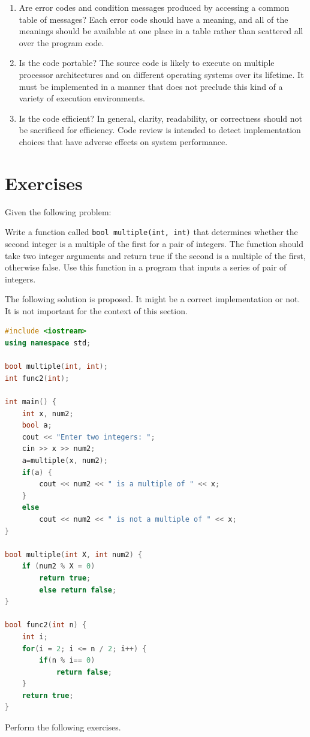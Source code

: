 \begin{enumerate}[nosep]
    \item Are error codes and condition messages produced by accessing a common table of messages? Each error code should have a meaning, and all of the meanings should be available at one place in a table rather than scattered all over the program code.
    \item Is the code portable? The source code is likely to execute on multiple processor architectures and on different operating systems over its lifetime. It must be implemented in a manner that does not preclude this kind of a variety of execution environments.
    \item Is the code efficient? In general, clarity, readability, or correctness should not be sacrificed for efficiency. Code review is intended to detect implementation choices that have adverse effects on system performance.
\end{enumerate}

\section{Exercises}
Given the following problem:
\begin{displayquote}
    Write a function called \lstinline!bool multiple(int, int)! that determines whether the second integer is a multiple of the first for a pair of integers. The function should take two integer arguments and return true if the second is a multiple of the first, otherwise false. Use this function in a program that inputs a series of pair of integers.
\end{displayquote}
The following solution is proposed. It might be a correct implementation or not. It is not important for the context of this section.
\begin{lstlisting}[language=C++,caption={A \CC~program that confirms a number is multiple of another.}]
#include <iostream>
using namespace std;

bool multiple(int, int);
int func2(int);

int main() {
    int x, num2;
    bool a;
    cout << "Enter two integers: ";
    cin >> x >> num2;
    a=multiple(x, num2);
    if(a) {
        cout << num2 << " is a multiple of " << x;
    }
    else
        cout << num2 << " is not a multiple of " << x;
}

bool multiple(int X, int num2) {
    if (num2 % X = 0)
        return true;
        else return false;
}

bool func2(int n) {
    int i;
    for(i = 2; i <= n / 2; i++) {
        if(n % i== 0)
            return false;
    }
    return true;
}
\end{lstlisting}
Perform the following exercises.

